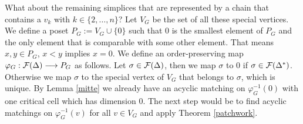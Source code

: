 \documentclass{elsarticle}
\begin{document}
What about the remaining simplices that are represented by a chain that contains a $v_k$ with $k\in\{2,\ldots, n\}$? Let $V_G$ be the set of all these special vertices. We define a poset $P_G:=V_G\cup\{0\}$ such that $0$ is the smallest element of $P_G$ and the only element that is comparable with some other element. That means $x,y\in P_G$, $x<y$ implies $x=0$. We define an order-preserving map $\varphi_G:{\cal F}(\Delta)\longrightarrow P_G$ as follows. Let $\sigma\in{\cal F}(\Delta)$, then we map $\sigma$ to $0$ if $\sigma\in{\cal F}(\Delta^*)$. Otherwise we map $\sigma$ to the special vertex of $V_G$ that belongs to $\sigma$, which is unique. By Lemma \ref{mitte} we already have an acyclic matching on $\varphi_G^{-1}(0)$ with one critical cell which has dimension $0$. The next step would be to find acyclic matchings on $\varphi_G^{-1}(v)$ for all $v\in V_G$ and apply Theorem \ref{patchwork}.
\end{document}
